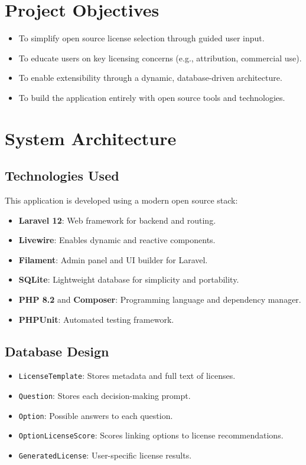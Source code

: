\documentclass[12pt,a4paper]{report}
\begin{document}
\chapter{Project Objectives}
\begin{itemize}
    \item To simplify open source license selection through guided user input.
    \item To educate users on key licensing concerns (e.g., attribution, commercial use).
    \item To enable extensibility through a dynamic, database-driven architecture.
    \item To build the application entirely with open source tools and technologies.
\end{itemize}

\chapter{System Architecture}
\section{Technologies Used}
This application is developed using a modern open source stack:
\begin{itemize}
    \item \textbf{Laravel 12}: Web framework for backend and routing.
    \item \textbf{Livewire}: Enables dynamic and reactive components.
    \item \textbf{Filament}: Admin panel and UI builder for Laravel.
    \item \textbf{SQLite}: Lightweight database for simplicity and portability.
    \item \textbf{PHP 8.2} and \textbf{Composer}: Programming language and dependency manager.
    \item \textbf{PHPUnit}: Automated testing framework.
\end{itemize}

\section{Database Design}
\begin{itemize}
    \item \texttt{LicenseTemplate}: Stores metadata and full text of licenses.
    \item \texttt{Question}: Stores each decision-making prompt.
    \item \texttt{Option}: Possible answers to each question.
    \item \texttt{OptionLicenseScore}: Scores linking options to license recommendations.
    \item \texttt{GeneratedLicense}: User-specific license results.
\end{itemize}
\end{document}
